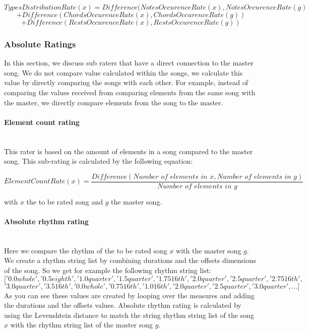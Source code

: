 \documentclass[a4paper]{article}
\begin{document}
\[ TypesDistributionRate(x) = Difference( NotesOccurenceRate(x) , NotesOccurenceRate(g) \]
\[+ Difference( ChordsOccurenceRate(x) , ChordsOccurenceRate(g)) \]
\[+ Difference( RestsOccurenceRate(x) , RestsOccurenceRate(g)) \]


\subsubsection{Absolute Ratings}
In this section, we discuss sub raters that have a direct connection to the master song. We do not compare value calculated within the songs, we calculate this value by directly comparing the songs with each other. For example, instead of comparing the values received from comparing elements from the same song with the master, we directly compare elements from the song to the master. 


\paragraph{Element count rating}\mbox{}\\
This rater is based on the amount of elements in a song compared to the master song. This sub-rating is calculated by the following equation:

\[ ElementCountRate(x) = \frac{Difference(\textit{Number of elements in x},\textit{Number of elements in g}) }{\textit{Number of elements in g} } \]

with $x$ the to be rated song and $g$ the master song.

\paragraph{Absolute rhythm rating}\mbox{}\\
Here we compare the rhythm of the to be rated song $x$ with the master song $g$. We create a rhythm string list by combining durations and the offsets dimensions of the song. So we get for example the following rhythm string list:
\[ ['0.0whole', '0.5eighth', '1.0quarter', '1.5quarter', '1.7516th', '2.0quarter', '2.5quarter', '2.7516th',\]
\[ '3.0quarter', '3.516th', '0.0whole', '0.7516th', '1.016th', '2.0quarter', '2.5quarter', '3.0quarter', ...]\]
As you can see these values are created by looping over the measures and adding the durations and the offsets values. Absolute rhythm rating is calculated by using the Levenshtein distance to match the string rhythm string list of the song $x$ with the rhythm string list of the master song $g$.
\end{document}

